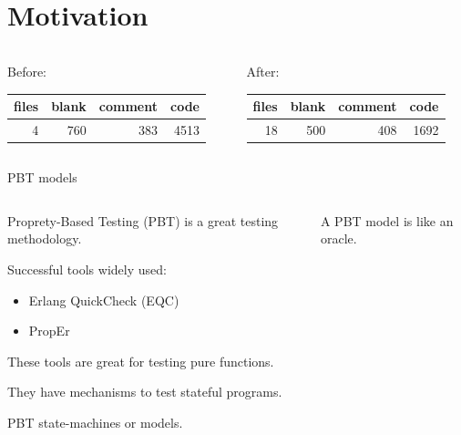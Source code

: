 \documentclass[aspectratio=169, 10pt, handout]{beamer}
\begin{document}
\whitetheme

\section{Motivation}
\label{sec:org90b48df}
\begin{frame}[label={sec:org1d26db6}]{}
\begin{columns}
\begin{column}{0.38\columnwidth}
Before:
\begin{center}
\begin{tabular}{rrrr}
files & blank & comment & code\\
\hline
4 & 760 & 383 & 4513\\
\end{tabular}
\end{center}
\end{column}
\begin{column}{0.38\columnwidth}
After:
\begin{center}
\begin{tabular}{rrrr}
files & blank & comment & code\\
\hline
18 & 500 & 408 & 1692\\
\end{tabular}
\end{center}
\end{column}
\end{columns}
\end{frame}

\begin{frame}[label={sec:orgfac5aa2}]{PBT models}
\begin{columns}
\begin{column}{0.48\columnwidth}
Proprety-Based Testing (PBT) is a great testing methodology.

\vspace{10pt}

Successful tools widely used:
\begin{itemize}
\item Erlang QuickCheck (EQC)
\item PropEr
\end{itemize}

\vspace{10pt}

These tools are great for testing pure functions.

\vspace{10pt}

They have mechanisms to test stateful programs.

\vspace{10pt}

PBT state-machines or models.
\end{column}

\begin{column}{0.48\columnwidth}
A PBT model is like an oracle.

\vspace{10pt}
\end{column}
\end{columns}
\end{frame}
\end{document}
